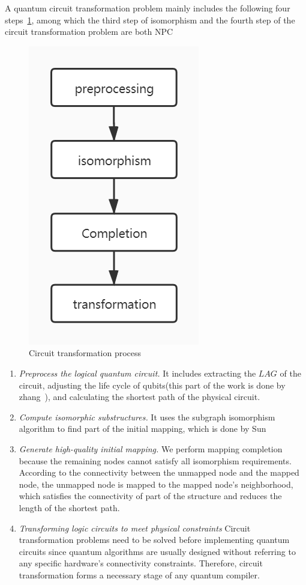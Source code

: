 \documentclass[runningheads]{llncs}
\begin{document}
A quantum circuit transformation problem mainly includes the following four steps~\ref{processing}, among which the third step of isomorphism and the fourth step of the circuit transformation problem are both NPC~\cite{2018QubitSiraichi}
\begin{figure}[h!] 
	\centering
	\includegraphics[scale=0.4]{uml.jpg}		 
	\caption{Circuit transformation process}
	\label{processing}	
	 \end{figure}
\begin{enumerate}
	\item \emph{ Preprocess the logical quantum circuit.} 
	It includes extracting the $LAG$ of the circuit, adjusting the life cycle of qubits(this part of the work is done by zhang~\cite{2019Zhang}),  and calculating the shortest path of the physical circuit.
	\item \emph{Compute isomorphic substructures.}
	It uses the subgraph isomorphism algorithm to find part of the initial mapping, which is done by Sun~\cite{Sun2020}   
	\item \emph{Generate high-quality initial mapping.} We perform mapping completion because the remaining nodes cannot satisfy all isomorphism requirements. According to the connectivity between the unmapped node and the mapped node, the unmapped node is mapped to the mapped node's neighborhood, which satisfies the connectivity of part of the structure and reduces the length of the shortest path.  
	\item \emph{Transforming logic circuits to meet physical constraints}
	Circuit transformation problems need to be solved before implementing quantum circuits since quantum algorithms are usually designed without referring to any specific hardware's connectivity constraints. Therefore, circuit transformation forms a necessary stage of any quantum compiler.
\end{enumerate}
\end{document}
